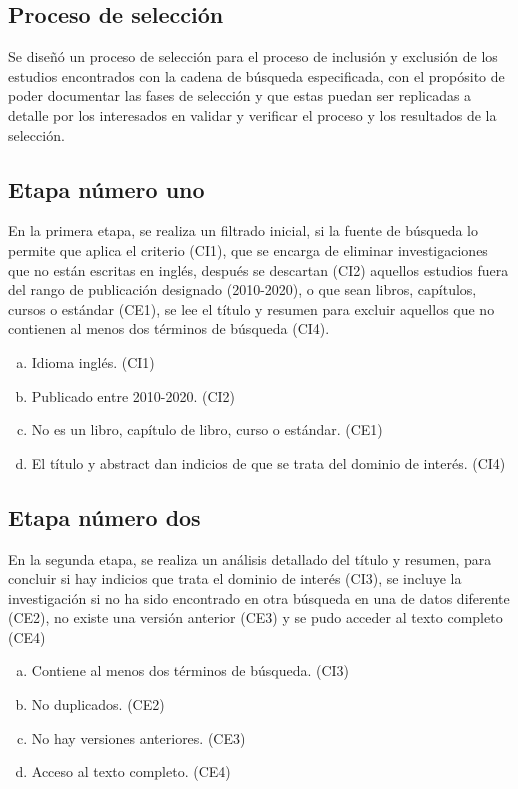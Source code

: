 \documentclass[conference,onecolumn,10pt]{IEEEtran}
\begin{document}
\subsection{Proceso de selección} \label{ssec:pro-selec}

Se diseñó un proceso de selección para el proceso de inclusión y exclusión de los estudios 
encontrados con la cadena de búsqueda especificada, con el propósito de poder documentar 
las fases de selección y que estas puedan ser replicadas a detalle por los 
interesados en validar y verificar el proceso y los resultados de la selección.

\subsection{Etapa número uno}
En la primera etapa, se realiza un filtrado inicial, si la fuente de búsqueda 
lo permite que aplica el criterio (CI1), que se encarga de eliminar 
investigaciones que no están escritas en inglés, después 
se descartan (CI2) aquellos estudios fuera del rango de publicación designado (2010-2020), 
o que sean libros, capítulos, cursos o estándar (CE1), se lee el título y resumen para 
excluir aquellos que no contienen al menos dos términos de búsqueda (CI4).

\begin{enumerate}[(a)]
  \item{Idioma inglés. (CI1)}
  \item{Publicado entre 2010-2020. (CI2)}
  \item{No es un libro, capítulo de libro, curso o estándar. (CE1)}
  \item{El título y abstract dan indicios de que se trata del dominio de interés. (CI4)}
\end{enumerate}

\subsection{Etapa número dos}
En la segunda etapa, se realiza un análisis detallado del título y resumen, para 
concluir si hay indicios que trata el dominio de interés (CI3), se incluye 
la investigación si no ha sido encontrado en otra búsqueda en una de datos diferente (CE2), 
no existe una versión anterior (CE3) y se pudo acceder al texto completo (CE4)

\begin{enumerate}[(a)]
  \item{Contiene al menos dos términos de búsqueda. (CI3)}
  \item{No duplicados. (CE2)}
  \item{No hay versiones anteriores. (CE3) }
  \item{Acceso al texto completo. (CE4)}
\end{enumerate}
\end{document}
